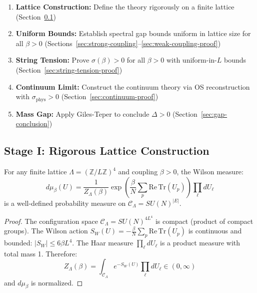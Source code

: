 \begin{tcolorbox}[colback=blue!5,colframe=blue!60!black,title=\textbf{Proof Structure}]
\begin{enumerate}
\item[\textbf{I.}] \textbf{Lattice Construction:} Define the theory rigorously on 
a finite lattice (Section~\ref{sec:lattice})
\item[\textbf{II.}] \textbf{Uniform Bounds:} Establish spectral gap bounds uniform 
in lattice size for all $\beta > 0$ (Sections~\ref{sec:strong-coupling}--\ref{sec:weak-coupling-proof})
\item[\textbf{III.}] \textbf{String Tension:} Prove $\sigma(\beta) > 0$ for all 
$\beta > 0$ with uniform-in-$L$ bounds (Section~\ref{sec:string-tension-proof})
\item[\textbf{IV.}] \textbf{Continuum Limit:} Construct the continuum theory via 
OS reconstruction with $\sigma_{\mathrm{phys}} > 0$ (Section~\ref{sec:continuum-proof})
\item[\textbf{V.}] \textbf{Mass Gap:} Apply Giles-Teper to conclude $\Delta > 0$ 
(Section~\ref{sec:gap-conclusion})
\end{enumerate}
\end{tcolorbox}

\subsection{Stage I: Rigorous Lattice Construction}
\label{sec:lattice}

\begin{lemma}
\label{lem:lattice-measure-rigorous}
For any finite lattice $\Lambda = (\mathbb{Z}/L\mathbb{Z})^4$ and coupling 
$\beta > 0$, the Wilson measure:
\[
d\mu_\beta(U) = \frac{1}{Z_\Lambda(\beta)} \exp\left(\frac{\beta}{N} \sum_p \mathrm{Re}\,\mathrm{Tr}(U_p)\right) \prod_\ell dU_\ell
\]
is a well-defined probability measure on $\mathcal{C}_\Lambda = SU(N)^{|E|}$.
\end{lemma}

\begin{proof}
The configuration space $\mathcal{C}_\Lambda = SU(N)^{4L^4}$ is compact (product 
of compact groups). The Wilson action $S_W(U) = -\frac{\beta}{N}\sum_p \mathrm{Re}\,\mathrm{Tr}(U_p)$ 
is continuous and bounded: $|S_W| \leq 6\beta L^4$. The Haar measure $\prod_\ell dU_\ell$ 
is a product measure with total mass 1. Therefore:
\[
Z_\Lambda(\beta) = \int_{\mathcal{C}_\Lambda} e^{-S_W(U)} \prod_\ell dU_\ell \in (0, \infty)
\]
and $d\mu_\beta$ is normalized.
\end{proof}


